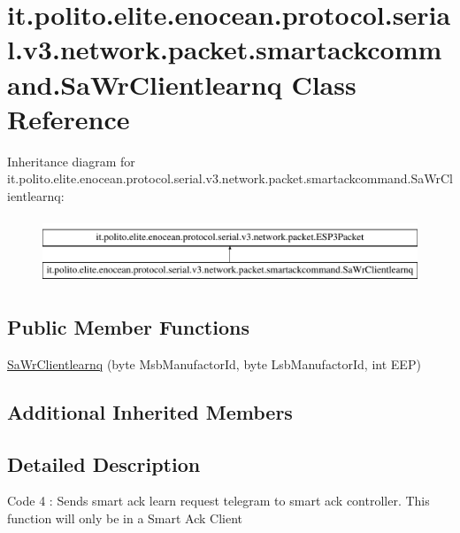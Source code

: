 \hypertarget{classit_1_1polito_1_1elite_1_1enocean_1_1protocol_1_1serial_1_1v3_1_1network_1_1packet_1_1smartac6ec9913ba1c4bbb209cea5223610532}{}\section{it.\+polito.\+elite.\+enocean.\+protocol.\+serial.\+v3.\+network.\+packet.\+smartackcommand.\+Sa\+Wr\+Clientlearnq Class Reference}
\label{classit_1_1polito_1_1elite_1_1enocean_1_1protocol_1_1serial_1_1v3_1_1network_1_1packet_1_1smartac6ec9913ba1c4bbb209cea5223610532}
Inheritance diagram for it.\+polito.\+elite.\+enocean.\+protocol.\+serial.\+v3.\+network.\+packet.\+smartackcommand.\+Sa\+Wr\+Clientlearnq\+:\begin{figure}[H]
\begin{center}
\leavevmode
\includegraphics[height=2.000000cm]{classit_1_1polito_1_1elite_1_1enocean_1_1protocol_1_1serial_1_1v3_1_1network_1_1packet_1_1smartac6ec9913ba1c4bbb209cea5223610532}
\end{center}
\end{figure}
\subsection*{Public Member Functions}
\begin{DoxyCompactItemize}
\item 
\hyperlink{classit_1_1polito_1_1elite_1_1enocean_1_1protocol_1_1serial_1_1v3_1_1network_1_1packet_1_1smartac6ec9913ba1c4bbb209cea5223610532_ad2616417c9381700fd372381f30b4491}{Sa\+Wr\+Clientlearnq} (byte Msb\+Manufactor\+Id, byte Lsb\+Manufactor\+Id, int E\+EP)
\end{DoxyCompactItemize}
\subsection*{Additional Inherited Members}


\subsection{Detailed Description}
Code 4 \+: Sends smart ack learn request telegram to smart ack controller. This function will only be in a Smart Ack Client


